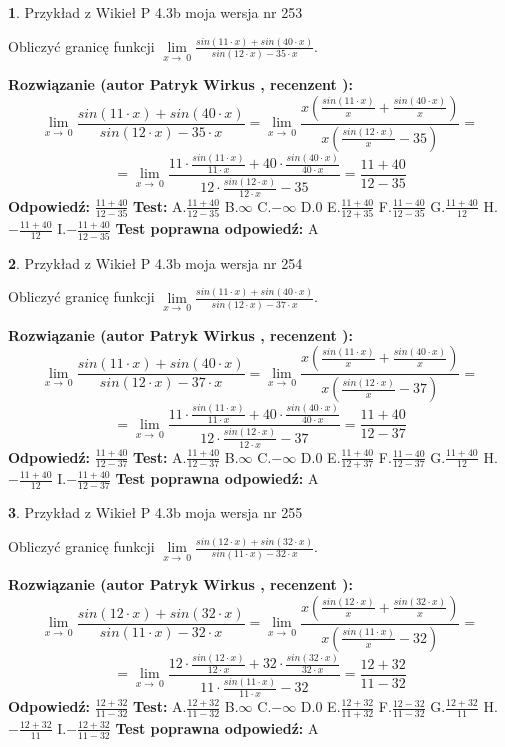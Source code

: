 \documentclass[12pt, a4paper]{article}
\theoremstyle{definition} %
\newtheorem{zad}{}
\newcommand{\zadStart}[1]{\begin{zad}#1\newline}
\newcommand{\zadStop}{\end{zad}}
\newcommand{\rozwStart}[2]{\noindent \textbf{Rozwiązanie (autor #1 , recenzent #2): }\newline}
\newcommand{\rozwStop}{\newline}
\newcommand{\odpStart}{\noindent \textbf{Odpowiedź:}\newline}
\newcommand{\odpStop}{\newline}
\newcommand{\testStart}{\noindent \textbf{Test:}\newline}
\newcommand{\testStop}{\newline}
\newcommand{\kluczStart}{\noindent \textbf{Test poprawna odpowiedź:}\newline}
\newcommand{\kluczStop}{\newline}
\begin{document}
\zadStart{Przykład z Wikieł P 4.3b moja wersja nr 253}


Obliczyć granicę funkcji $\lim\limits_{x\to\ 0}\frac{sin(11 \cdot x)+sin(40 \cdot x)}{sin(12 \cdot x)-35 \cdot x}$.
\zadStop
\rozwStart{Patryk Wirkus}{}
$$\lim\limits_{x\to\ 0}\frac{sin(11 \cdot x)+sin(40 \cdot x)}{sin(12 \cdot x)-35 \cdot x}=\lim\limits_{x\to\ 0}\frac{x(\frac{sin(11 \cdot x)}{x}+\frac{sin(40 \cdot x)}{x})}{x(\frac{sin(12 \cdot x)}{x}-35)}=$$
$$=\lim\limits_{x\to\ 0}\frac{11 \cdot \frac{sin(11 \cdot x)}{11 \cdot x}+40 \cdot \frac{sin(40 \cdot x)}{40 \cdot x}}{12 \cdot \frac{sin(12 \cdot x)}{12 \cdot x}-35}=\frac{11+40}{12-35}$$
\rozwStop
\odpStart
$\frac{11+40}{12-35}$
\odpStop
\testStart
A.$\frac{11+40}{12-35}$
B.$\infty$
C.$-\infty$
D.$0$
E.$\frac{11+40}{12+35}$
F.$\frac{11-40}{12-35}$
G.$\frac{11+40}{12}$
H.$-\frac{11+40}{12}$
I.$-\frac{11+40}{12-35}$
\testStop
\kluczStart
A
\kluczStop



\zadStart{Przykład z Wikieł P 4.3b moja wersja nr 254}


Obliczyć granicę funkcji $\lim\limits_{x\to\ 0}\frac{sin(11 \cdot x)+sin(40 \cdot x)}{sin(12 \cdot x)-37 \cdot x}$.
\zadStop
\rozwStart{Patryk Wirkus}{}
$$\lim\limits_{x\to\ 0}\frac{sin(11 \cdot x)+sin(40 \cdot x)}{sin(12 \cdot x)-37 \cdot x}=\lim\limits_{x\to\ 0}\frac{x(\frac{sin(11 \cdot x)}{x}+\frac{sin(40 \cdot x)}{x})}{x(\frac{sin(12 \cdot x)}{x}-37)}=$$
$$=\lim\limits_{x\to\ 0}\frac{11 \cdot \frac{sin(11 \cdot x)}{11 \cdot x}+40 \cdot \frac{sin(40 \cdot x)}{40 \cdot x}}{12 \cdot \frac{sin(12 \cdot x)}{12 \cdot x}-37}=\frac{11+40}{12-37}$$
\rozwStop
\odpStart
$\frac{11+40}{12-37}$
\odpStop
\testStart
A.$\frac{11+40}{12-37}$
B.$\infty$
C.$-\infty$
D.$0$
E.$\frac{11+40}{12+37}$
F.$\frac{11-40}{12-37}$
G.$\frac{11+40}{12}$
H.$-\frac{11+40}{12}$
I.$-\frac{11+40}{12-37}$
\testStop
\kluczStart
A
\kluczStop



\zadStart{Przykład z Wikieł P 4.3b moja wersja nr 255}


Obliczyć granicę funkcji $\lim\limits_{x\to\ 0}\frac{sin(12 \cdot x)+sin(32 \cdot x)}{sin(11 \cdot x)-32 \cdot x}$.
\zadStop
\rozwStart{Patryk Wirkus}{}
$$\lim\limits_{x\to\ 0}\frac{sin(12 \cdot x)+sin(32 \cdot x)}{sin(11 \cdot x)-32 \cdot x}=\lim\limits_{x\to\ 0}\frac{x(\frac{sin(12 \cdot x)}{x}+\frac{sin(32 \cdot x)}{x})}{x(\frac{sin(11 \cdot x)}{x}-32)}=$$
$$=\lim\limits_{x\to\ 0}\frac{12 \cdot \frac{sin(12 \cdot x)}{12 \cdot x}+32 \cdot \frac{sin(32 \cdot x)}{32 \cdot x}}{11 \cdot \frac{sin(11 \cdot x)}{11 \cdot x}-32}=\frac{12+32}{11-32}$$
\rozwStop
\odpStart
$\frac{12+32}{11-32}$
\odpStop
\testStart
A.$\frac{12+32}{11-32}$
B.$\infty$
C.$-\infty$
D.$0$
E.$\frac{12+32}{11+32}$
F.$\frac{12-32}{11-32}$
G.$\frac{12+32}{11}$
H.$-\frac{12+32}{11}$
I.$-\frac{12+32}{11-32}$
\testStop
\kluczStart
A
\kluczStop
\end{document}
